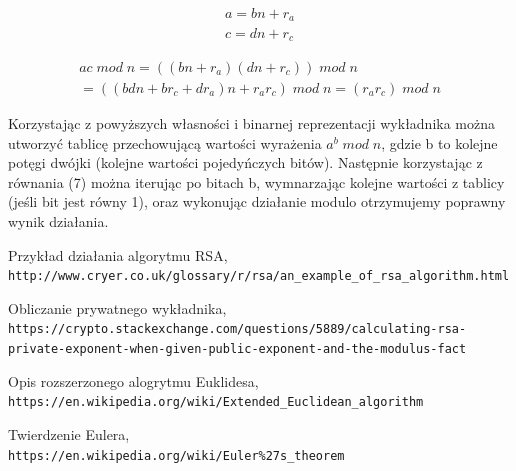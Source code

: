 \documentclass{article}
\begin{document}
\begin{equation}\label{eq:pareto mle2} 
	\begin{aligned}
		a = b n + r_a \\
		c = d n + r_c	
	\end{aligned}
\end{equation}

\begin{equation*}\label{eq:pareto mle2}
	\begin{aligned}
		a c \; mod \; n = ((b n + r_a)(d n + r_c)) \; mod \; n  \\
		= ((b d n + b r_c + d r_a) n + r_a r_c) \; mod \; n = (r_a r_c) \; mod \; n
	\end{aligned}
\end{equation*}	

Korzystając z powyższych własności i binarnej reprezentacji wykładnika można utworzyć tablicę przechowującą wartości wyrażenia $a^b \; mod \; n$, gdzie b to kolejne potęgi dwójki (kolejne wartości pojedyńczych bitów). Następnie korzystając z równania (7) można iterując po bitach b, wymnarzając kolejne wartości z tablicy (jeśli bit jest równy 1), oraz wykonując działanie modulo otrzymujemy poprawny wynik działania. 


\newpage
\begin{thebibliography}{9}

Przykład działania algorytmu RSA,
\\\texttt{http://www.cryer.co.uk/glossary/r/rsa/an\_example\_of\_rsa\_algorithm.html}

Obliczanie prywatnego wykładnika,
\\\texttt{https://crypto.stackexchange.com/questions/5889/calculating-rsa-\\private-exponent-when-given-public-exponent-and-the-modulus-fact}

Opis rozszerzonego alogrytmu Euklidesa,
\\\texttt{https://en.wikipedia.org/wiki/Extended\_Euclidean\_algorithm}

Twierdzenie Eulera,
\\\texttt{https://en.wikipedia.org/wiki/Euler\%27s\_theorem}

\end{thebibliography}
\end{document}
